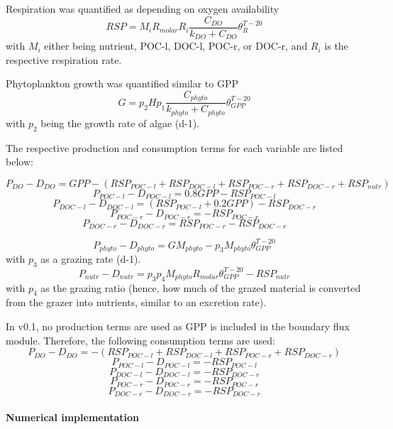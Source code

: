 \documentclass[
  letterpaper,
  DIV=11,
  numbers=noendperiod]{scrartcl}
\let\oldparagraph\paragraph
\renewcommand{\paragraph}[1]{\oldparagraph{#1}\mbox{}}
\begin{document}
Respiration was quantified as depending on oxygen availability \[
RSP = M_{i} R_{molar} R_i \frac{C_{DO}}{k_{DO} + C_{DO}} \theta_{R}^{T-20}
\] with \(M_{i}\) either being nutrient, POC-l, DOC-l, POC-r, or DOC-r,
and \(R_i\) is the respective respiration rate.

Phytoplankton growth was quantified similar to GPP \[
G = p_2 H p_1 \frac{C_{phyto}}{k_{phyto} + C_{phyto}} \theta_{GPP}^{T-20}
\] with \(p_2\) being the growth rate of algae (d-1).

The respective production and consumption terms for each variable are
listed below:

\[
P_{DO} - D_{DO} = GPP - (RSP_{POC-l} + RSP_{DOC-l} + RSP_{POC-r} + RSP_{DOC-r} + RSP_{nutr})
\] \[
P_{POC-l} - D_{POC-l} = 0.8 GPP - RSP_{POC-l} 
\] \[
P_{DOC-l} - D_{DOC-l} = (RSP_{POC-l} + 0.2 GPP) - RSP_{DOC-r} 
\] \[
P_{POC-r} - D_{POC-r} =  - RSP_{POC-r} 
\] \[
P_{DOC-r} - D_{DOC-r} = RSP_{POC-r} - RSP_{DOC-r} 
\]

\[
P_{phyto} - D_{phyto} = G M_{phyto} - p_3 M_{phyto}  \theta_{GPP}^{T-20}
\] with \(p_3\) as a grazing rate (d-1). \[
P_{nutr} - D_{nutr} = p_3 p_4 M_{phyto} R_{molar}  \theta_{GPP}^{T-20} - RSP_{nutr}
\] with \(p_4\) as the grazing ratio (hence, how much of the grazed
material is converted from the grazer into nutrients, similar to an
excretion rate).

\begin{tcolorbox}[enhanced jigsaw, breakable, toprule=.15mm, rightrule=.15mm, bottomtitle=1mm, left=2mm, bottomrule=.15mm, leftrule=.75mm, opacityback=0, toptitle=1mm, arc=.35mm, coltitle=black, colframe=quarto-callout-note-color-frame, title=\textcolor{quarto-callout-note-color}{\faInfo}\hspace{0.5em}{Note}, opacitybacktitle=0.6, titlerule=0mm, colback=white, colbacktitle=quarto-callout-note-color!10!white]

In v0.1, no production terms are used as GPP is included in the boundary
flux module. Therefore, the following consumption terms are used: \[
P_{DO} - D_{DO} = - (RSP_{POC-l} + RSP_{DOC-l} + RSP_{POC-r} + RSP_{DOC-r})
\] \[
P_{POC-l} - D_{POC-l} = - RSP_{POC-l} 
\] \[
P_{DOC-l} - D_{DOC-l} = - RSP_{DOC-r} 
\] \[
P_{POC-r} - D_{POC-r} =  - RSP_{POC-r} 
\] \[
P_{DOC-r} - D_{DOC-r} =  - RSP_{DOC-r} 
\]

\end{tcolorbox}

\hypertarget{numerical-implementation-1}{%
\paragraph{Numerical implementation}\label{numerical-implementation-1}}
\end{document}
